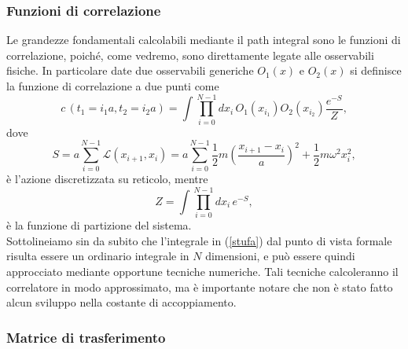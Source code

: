 \documentclass{article}
\begin{document}
\subsubsection{Funzioni di correlazione}
Le grandezze fondamentali calcolabili mediante il path integral sono le funzioni di correlazione, poiché, come vedremo, sono direttamente legate alle osservabili fisiche.  In particolare date due osservabili generiche $O_1(x)$ e $O_2(x)$ si definisce la funzione di correlazione a due punti come 
\begin{equation}
    \label{stufa}
    c\,(t_1=i_1a, t_2=i_2a)=\int \prod_{i=0}^{N-1} dx_i\,O_1(x_{i_1})O_2(x_{i_2})\frac{e^{-S}}{Z}, 
\end{equation}
dove 
\begin{equation}
    \label{azione}
    S=a\sum_{i=0}^{N-1} \mathcal{L}(x_{i+1}, x_i)=a\sum_{i=0}^{N-1} \frac{1}{2}m\left(\frac{x_{i+1}-x_i}{a}\right)^2+\frac{1}{2}m\omega^2x_i^2,
\end{equation}
è l'azione discretizzata su reticolo, mentre 
\begin{equation}
    Z=\int \prod_{i=0}^{N-1} dx_i\, e^{-S},
\end{equation}
è la funzione di partizione del sistema. \\
Sottolineiamo sin da subito che l'integrale in (\ref{stufa}) dal punto di vista formale risulta essere un ordinario integrale in $N$ dimensioni, e può essere quindi approcciato mediante opportune tecniche numeriche. Tali tecniche calcoleranno il correlatore in modo approssimato, ma è importante notare che non è stato fatto alcun sviluppo nella costante di accoppiamento. 

\subsubsection{Matrice di trasferimento}
\end{document}
